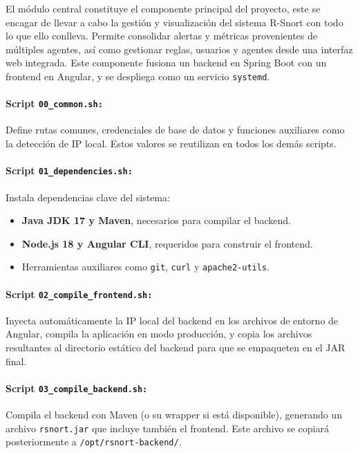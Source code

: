 \documentclass[11pt,a4paper,twoside]{report}
\begin{document}
El módulo central constituye el componente principal del proyecto, este se encagar de llevar a cabo la gestión y visualización del sistema R-Snort con todo lo que ello conlleva. Permite consolidar alertas y métricas provenientes de múltiples agentes, así como gestionar reglas, usuarios y agentes desde una interfaz web integrada. Este componente fusiona un backend en Spring Boot con un frontend en Angular, y se despliega como un servicio \texttt{systemd}.

\paragraph{Script \texttt{00\_common.sh:}} Define rutas comunes, credenciales de base de datos y funciones auxiliares como la detección de IP local. Estos valores se reutilizan en todos los demás scripts.

\paragraph{Script \texttt{01\_dependencies.sh:}} Instala dependencias clave del sistema:
\begin{itemize}
	\item \textbf{Java JDK 17 y Maven}, necesarios para compilar el backend.
	\item \textbf{Node.js 18 y Angular CLI}, requeridos para construir el frontend.
	\item Herramientas auxiliares como \texttt{git}, \texttt{curl} y \texttt{apache2-utils}.
\end{itemize}

\paragraph{Script \texttt{02\_compile\_frontend.sh:}} Inyecta automáticamente la IP local del backend en los archivos de entorno de Angular, compila la aplicación en modo producción, y copia los archivos resultantes al directorio estático del backend para que se empaqueten en el JAR final.

\paragraph{Script \texttt{03\_compile\_backend.sh:}} Compila el backend con Maven (o su wrapper si está disponible), generando un archivo \texttt{rsnort.jar} que incluye también el frontend. Este archivo se copiará posteriormente a \texttt{/opt/rsnort-backend/}.
\end{document}
